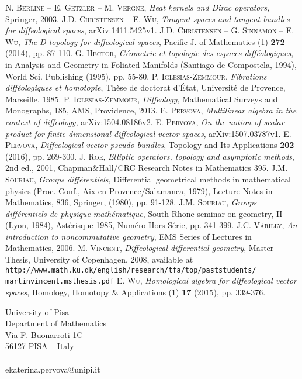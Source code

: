 \documentclass{article}
\begin{document}
\begin{thebibliography}{99}
\textsc{N. Berline -- E. Getzler -- M. Vergne}, \textit{Heat kernels and Dirac operators}, Springer, 2003.
\textsc{J.D. Christensen -- E. Wu}, \textit{Tangent spaces and tangent bundles for diffeological spaces}, arXiv:1411.5425v1.
\textsc{J.D. Christensen -- G. Sinnamon -- E. Wu}, \textit{The D-topology for diffeological spaces}, Pacific J. of Mathematics (1) \textbf{272} (2014), pp. 87-110.
\textsc{G. Hector}, \textit{G\'eometrie et topologie des espaces diff\'eologiques}, in Analysis and Geometry in Foliated Manifolds (Santiago de Compostela, 1994), World Sci. Publishing (1995), pp. 55-80.
\textsc{P. Iglesias-Zemmour}, \textit{Fibrations diff\'eologiques et homotopie}, Th\`ese de doctorat d'\'Etat, Universit\'e de Provence, Marseille, 1985.
\textsc{P. Iglesias-Zemmour}, \textit{Diffeology}, Mathematical Surveys and Monographs, 185, AMS, Providence, 2013.
\textsc{E. Pervova}, \textit{Multilinear algebra in the context of diffeology}, arXiv:1504.08186v2.
\textsc{E. Pervova}, \textit{On the notion of scalar product for finite-dimensional diffeological vector spaces}, arXiv:1507.03787v1.
\textsc{E. Pervova}, \textit{Diffeological vector pseudo-bundles}, Topology and Its Applications \textbf{202} (2016), pp. 269-300.
\textsc{J. Roe}, \textit{Elliptic operators, topology and asymptotic methods}, 2nd ed., 2001, Chapman$\&$Hall/CRC Research Notes in Mathematics 395.
\textsc{J.M. Souriau}, \textit{Groups diff\'erentiels}, Differential geometrical methods in mathematical physics (Proc. Conf., Aix-en-Provence/Salamanca, 1979), Lecture Notes in Mathematics, 836, Springer, 
(1980), pp. 91-128.
\textsc{J.M. Souriau}, \textit{Groups diff\'erentiels de physique math\'ematique}, South Rhone seminar on geometry, II (Lyon, 1984), Ast\'erisque 1985, Num\'ero Hors S\'erie, pp. 341-399.
\textsc{J.C. V\'arilly}, \textit{An introduction to noncommutative geometry}, EMS Series of Lectures in Mathematics, 2006.
\textsc{M. Vincent}, \textit{Diffeological differential geometry}, Master Thesis, University of Copenhagen, 2008, available at {\tt http://www.math.ku.dk/english/research/tfa/top/paststudents/\\
martinvincent.msthesis.pdf}
\textsc{E. Wu}, \textit{Homological algebra for diffeological vector spaces}, Homology, Homotopy $\&$ Applications (1) \textbf{17} (2015), pp. 339-376.
\end{thebibliography}
\vspace{1cm}

\noindent University of Pisa \\
Department of Mathematics \\
Via F. Buonarroti 1C\\
56127 PISA -- Italy\\
\ \\
ekaterina.pervova@unipi.it\\
\end{document}
